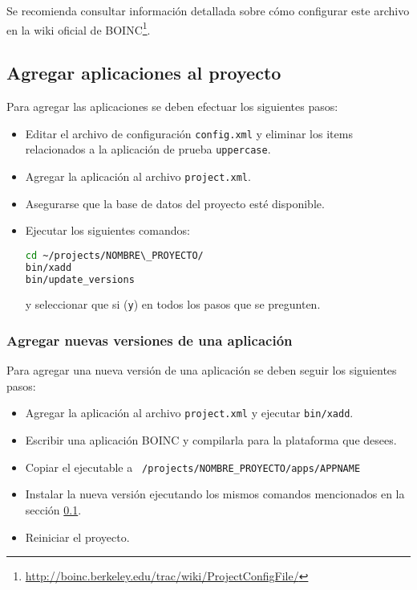 \documentclass[12pt,spanish,a4paper]{report}
\begin{document}
Se recomienda consultar información detallada sobre cómo configurar este archivo en la wiki oficial de BOINC\footnote{\url{http://boinc.berkeley.edu/trac/wiki/ProjectConfigFile/}}.

\subsection{Agregar aplicaciones al proyecto}
\label{boinc:xadd}
Para agregar las aplicaciones se deben efectuar los siguientes pasos:

\begin{itemize}
\item Editar el archivo de configuración \texttt{config.xml} y eliminar los items relacionados a la aplicación de prueba \texttt{uppercase}.
\item Agregar la aplicación al archivo \texttt{project.xml}.
\item Asegurarse que la base de datos del proyecto esté disponible.
\item Ejecutar los siguientes comandos:

\begin{lstlisting}[frame=shadowbox, language=bash, basicstyle=\footnotesize, backgroundcolor=\color{gris}]
cd ~/projects/NOMBRE\_PROYECTO/
bin/xadd
bin/update_versions
\end{lstlisting}

y seleccionar que si (\texttt{y}) en todos los pasos que se pregunten.
\end{itemize}

\subsubsection{Agregar nuevas versiones de una aplicación}

Para agregar una nueva versión de una aplicación se deben seguir los siguientes pasos:

\begin{itemize}
\item Agregar la aplicación al archivo \texttt{project.xml} y ejecutar \texttt{bin/xadd}.
\item Escribir una aplicación BOINC y compilarla para la plataforma que desees.
\item Copiar el ejecutable a \texttt{~/projects/NOMBRE\_PROYECTO/apps/APPNAME}
\item Instalar la nueva versión ejecutando los mismos comandos mencionados en la sección \ref{boinc:xadd}.
\item Reiniciar el proyecto.
\end{itemize}
\end{document}
